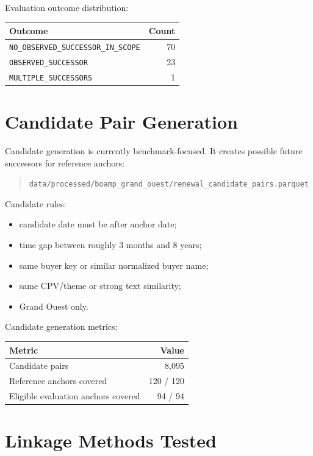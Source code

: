 \documentclass[11pt,a4paper]{article}
\newcommand{\code}[1]{\texttt{#1}}
\newcommand{\pathcode}[1]{{\small\nolinkurl{#1}}}
\begin{document}
Evaluation outcome distribution:

\begin{center}
\begin{tabular}{lr}
\toprule
Outcome & Count \\
\midrule
\code{NO\_OBSERVED\_SUCCESSOR\_IN\_SCOPE} & 70 \\
\code{OBSERVED\_SUCCESSOR} & 23 \\
\code{MULTIPLE\_SUCCESSORS} & 1 \\
\bottomrule
\end{tabular}
\end{center}

\section*{Candidate Pair Generation}

Candidate generation is currently benchmark-focused. It creates possible future successors for reference anchors:

\begin{quote}
\pathcode{data/processed/boamp_grand_ouest/renewal_candidate_pairs.parquet}
\end{quote}

Candidate rules:

\begin{itemize}
  \item candidate date must be after anchor date;
  \item time gap between roughly 3 months and 8 years;
  \item same buyer key or similar normalized buyer name;
  \item same CPV/theme or strong text similarity;
  \item Grand Ouest only.
\end{itemize}

Candidate generation metrics:

\begin{center}
\begin{tabular}{lr}
\toprule
Metric & Value \\
\midrule
Candidate pairs & 8,095 \\
Reference anchors covered & 120 / 120 \\
Eligible evaluation anchors covered & 94 / 94 \\
\bottomrule
\end{tabular}
\end{center}

\section*{Linkage Methods Tested}
\end{document}
